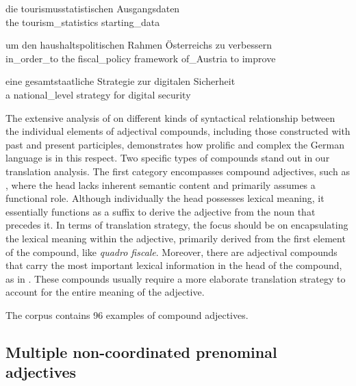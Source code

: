 \documentclass[output=paper,colorlinks,citecolor=brown]{langscibook}
\begin{document}
\ea%
    \label{ex:resi:16}
\gll die  tourismusstatistischen  Ausgangsdaten \\
   the  tourism\_statistics  starting\_data  \\
\z



\ea%
    \label{ex:resi:17}
\gll um  den  haushaltspolitischen  Rahmen  Österreichs  zu  verbessern \\
    in\_order\_to  the  fiscal\_policy  framework  of\_Austria  to  improve \\
\z



\ea%
    \label{ex:resi:18}
\gll eine  gesamtstaatliche  Strategie  zur  digitalen  Sicherheit \\
    a   national\_level  strategy  for  digital  security \\
\z



The extensive analysis of \citet{Pümpel-MaderEtAl1992} on different kinds of syntactical relationship between the individual elements of adjectival compounds, including those constructed with past and present participles, demonstrates how prolific and complex the German language is in this respect. Two specific types of compounds stand out in our translation analysis. The first category encompasses compound adjectives, such as , where the head lacks inherent semantic content and primarily assumes a functional role. Although individually the head possesses lexical meaning, it essentially functions as a suffix to derive the adjective from the noun that precedes it. In terms of translation strategy, the focus should be on encapsulating the lexical meaning within the adjective, primarily derived from the first element of the compound, like \textit{quadro fiscale}. Moreover, there are adjectival compounds that carry the most important lexical information in the head of the compound, as in . These compounds usually require a more elaborate translation strategy to account for the entire meaning of the adjective.

The corpus contains 96 examples of compound adjectives.

\subsection{Multiple non-coordinated prenominal adjectives}\label{sec:resi:4.3}
\end{document}
